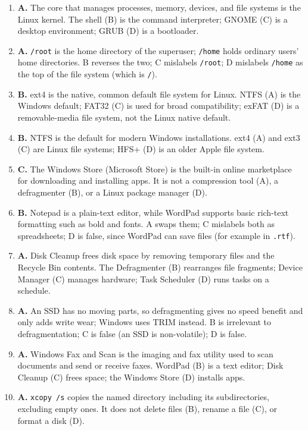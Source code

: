 \begin{enumerate}[label=\textbf{Q\arabic*.}, leftmargin=*]
  II and omits I; D includes II.
\item \textbf{A.} The core that manages processes, memory, devices, and file
  systems is the Linux kernel. The shell (B) is the command interpreter; GNOME
  (C) is a desktop environment; GRUB (D) is a bootloader.
\item \textbf{A.} \texttt{/root} is the home directory of the superuser;
  \texttt{/home} holds ordinary users' home directories. B reverses the two;
  C mislabels \texttt{/root}; D mislabels \texttt{/home} as the top of the
  file system (which is \texttt{/}).
\item \textbf{B.} ext4 is the native, common default file system for Linux.
  NTFS (A) is the Windows default; FAT32 (C) is used for broad compatibility;
  exFAT (D) is a removable-media file system, not the Linux native default.
\item \textbf{B.} NTFS is the default for modern Windows installations. ext4
  (A) and ext3 (C) are Linux file systems; HFS+ (D) is an older Apple file
  system.
\item \textbf{C.} The Windows Store (Microsoft Store) is the built-in online
  marketplace for downloading and installing apps. It is not a compression
  tool (A), a defragmenter (B), or a Linux package manager (D).
\item \textbf{B.} Notepad is a plain-text editor, while WordPad supports basic
  rich-text formatting such as bold and fonts. A swaps them; C mislabels both
  as spreadsheets; D is false, since WordPad can save files (for example in
  \texttt{.rtf}).
\item \textbf{A.} Disk Cleanup frees disk space by removing temporary files
  and the Recycle Bin contents. The Defragmenter (B) rearranges file
  fragments; Device Manager (C) manages hardware; Task Scheduler (D) runs
  tasks on a schedule.
\item \textbf{A.} An SSD has no moving parts, so defragmenting gives no speed
  benefit and only adds write wear; Windows uses TRIM instead. B is
  irrelevant to defragmentation; C is false (an SSD is non-volatile); D is
  false.
\item \textbf{A.} Windows Fax and Scan is the imaging and fax utility used to
  scan documents and send or receive faxes. WordPad (B) is a text editor;
  Disk Cleanup (C) frees space; the Windows Store (D) installs apps.
\item \textbf{A.} \texttt{xcopy /s} copies the named directory including its
  subdirectories, excluding empty ones. It does not delete files (B), rename a
  file (C), or format a disk (D).


\end{enumerate}
